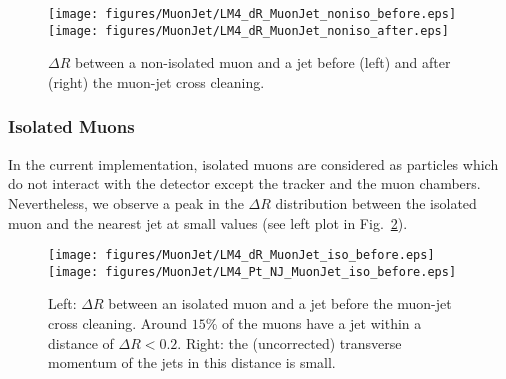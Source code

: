 \documentclass{cmspaper}
\begin{document}
\begin{figure}[hb]
\begin{center}
    \texttt{[image: figures/MuonJet/LM4\_dR\_MuonJet\_noniso\_before.eps]}
    \texttt{[image: figures/MuonJet/LM4\_dR\_MuonJet\_noniso\_after.eps]}
    \caption{\(\Delta R\) between a non-isolated muon and a jet before (left) and
    after (right) the muon-jet cross cleaning.}
\label{fig:dR_MuonJet_noniso}
\end{center}
\end{figure}

\subsubsection{Isolated Muons}
In the current implementation,
isolated muons are considered as particles which do not interact with the
detector except the tracker and the muon chambers.  Nevertheless, we observe a
peak in the \(\Delta R\) distribution between the isolated muon and the nearest
jet at small values (see left plot in Fig.~\ref{fig:dR_MuonJet_iso}).

\begin{figure}[hb]
\begin{center}
    \texttt{[image: figures/MuonJet/LM4\_dR\_MuonJet\_iso\_before.eps]}
    \texttt{[image: figures/MuonJet/LM4\_Pt\_NJ\_MuonJet\_iso\_before.eps]}
    \caption{Left: \(\Delta R\) between an isolated muon and a jet before the
    muon-jet cross cleaning. Around \(15\%\) of the muons have a jet within a
    distance of \(\Delta R < 0.2\). Right: the (uncorrected) transverse momentum of the jets in this distance is small.}
\label{fig:dR_MuonJet_iso}
\end{center}
\end{figure}
\end{document}

